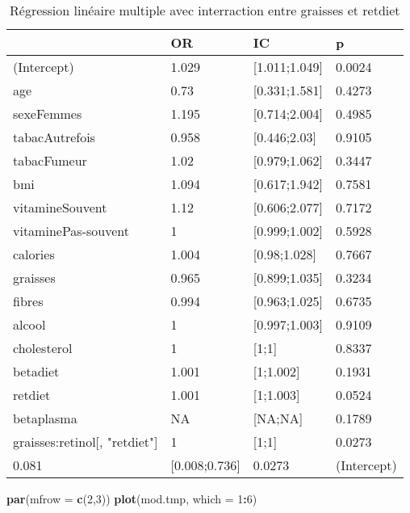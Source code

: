 \documentclass[]{article}
\newenvironment{Shaded}{\begin{snugshade}}{\end{snugshade}}
\newcommand{\KeywordTok}[1]{\textcolor[rgb]{0.13,0.29,0.53}{\textbf{#1}}}
\newcommand{\DataTypeTok}[1]{\textcolor[rgb]{0.13,0.29,0.53}{#1}}
\newcommand{\DecValTok}[1]{\textcolor[rgb]{0.00,0.00,0.81}{#1}}
\newcommand{\OperatorTok}[1]{\textcolor[rgb]{0.81,0.36,0.00}{\textbf{#1}}}
\newcommand{\NormalTok}[1]{#1}
\begin{document}
\begin{table}

\caption{\label{tab:unnamed-chunk-89}Régression linéaire multiple avec interraction entre graisses et retdiet}
\centering
\begin{tabular}[t]{l|l|l|l}
\hline
  & OR & IC & p\\
\hline
\rowcolor[HTML]{BBD2E1}  (Intercept) & 1.029 & [1.011;1.049] & 0.0024\\
\hline
age & 0.73 & [0.331;1.581] & 0.4273\\
\hline
\rowcolor[HTML]{BBD2E1}  sexeFemmes & 1.195 & [0.714;2.004] & 0.4985\\
\hline
tabacAutrefois & 0.958 & [0.446;2.03] & 0.9105\\
\hline
\rowcolor[HTML]{BBD2E1}  tabacFumeur & 1.02 & [0.979;1.062] & 0.3447\\
\hline
bmi & 1.094 & [0.617;1.942] & 0.7581\\
\hline
\rowcolor[HTML]{BBD2E1}  vitamineSouvent & 1.12 & [0.606;2.077] & 0.7172\\
\hline
vitaminePas-souvent & 1 & [0.999;1.002] & 0.5928\\
\hline
\rowcolor[HTML]{BBD2E1}  calories & 1.004 & [0.98;1.028] & 0.7667\\
\hline
graisses & 0.965 & [0.899;1.035] & 0.3234\\
\hline
\rowcolor[HTML]{BBD2E1}  fibres & 0.994 & [0.963;1.025] & 0.6735\\
\hline
alcool & 1 & [0.997;1.003] & 0.9109\\
\hline
\rowcolor[HTML]{BBD2E1}  cholesterol & 1 & [1;1] & 0.8337\\
\hline
betadiet & 1.001 & [1;1.002] & 0.1931\\
\hline
\rowcolor[HTML]{BBD2E1}  retdiet & 1.001 & [1;1.003] & 0.0524\\
\hline
betaplasma & NA & [NA;NA] & 0.1789\\
\hline
\rowcolor[HTML]{BBD2E1}  graisses:retinol[, "retdiet"] & 1 & [1;1] & 0.0273\\
\hline
0.081 & [0.008;0.736] & 0.0273 & (Intercept)\\
\hline
\end{tabular}
\end{table}

\begin{Shaded}
\begin{Highlighting}[]
\KeywordTok{par}\NormalTok{(}\DataTypeTok{mfrow =} \KeywordTok{c}\NormalTok{(}\DecValTok{2}\NormalTok{,}\DecValTok{3}\NormalTok{))}
\KeywordTok{plot}\NormalTok{(mod.tmp, }\DataTypeTok{which =} \DecValTok{1}\OperatorTok{:}\DecValTok{6}\NormalTok{)}
\end{Highlighting}
\end{Shaded}
\end{document}
